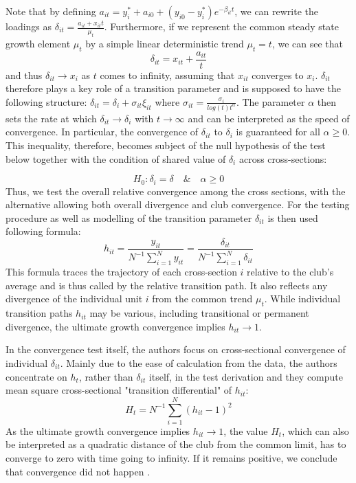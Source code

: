 \documentclass[11pt]{article}
\begin{document}
Note that by defining \(a_{it} = y_i^* + a_{i0} + (y_{i0} - y_i^*)e^{-\beta_{it}t} \), we can rewrite the loadings as \(\delta_{it} = \frac{a_{it} + x_{it}t}{\mu_t}\). Furthermore, if we represent the common steady state growth element $\mu_t$ by a simple linear deterministic trend \(\mu_t = t\), we can see that
\begin{equation} \label{eq5}\delta_{it} = x_{it} + \frac{a_{it}}{t} \end{equation}  and thus \(\delta_{it} \rightarrow x_i\) as $t$ comes to infinity, assuming that $x_{it}$ converges to $x_{i}$. $\delta_{it}$ therefore plays a key role of a transition parameter and is supposed to have the following structure: \(\delta_{it} = \delta_{i} + \sigma_{it}\xi_{it}\) where \( \sigma_{it} = \frac{\sigma_{i}}{log(t)t^\alpha}\). The parameter $\alpha$ then sets the rate at which \(\delta_{it} \rightarrow \delta_{i}\) with \(t \rightarrow \infty\) and can be interpreted as the speed of convergence. In particular, the convergence of $\delta_{it}$ to $\delta_{i}$ is guaranteed for all \(\alpha \geq 0\). This inequality, therefore, becomes subject of the null hypothesis of the test below together with the condition of shared value of $\delta_{i}$ across cross-sections: 

\begin{equation} \label{eq6} H_0: \delta_{i} = \delta \quad \& \quad \alpha \geq 0 \end{equation} Thus, we test the overall relative convergence among the cross sections, with the alternative allowing both overall divergence and club convergence.
For the testing procedure as well as modelling of the transition parameter $\delta_{it}$ is then used following formula:
\begin{equation}\label{eq8}h_{it} = \frac{y_{it}}{N^{-1}\sum\limits_{i=1}^Ny_{it}} = \frac{\delta_{it}}{N^{-1}\sum\limits_{i=1}^N\delta_{it}}\end{equation}
This formula traces the trajectory of each cross-section $i$ relative to the club's average and is thus called by \citet{phillips2009economic} the relative transition path. It also reflects any divergence of the individual unit $i$ from the common trend $\mu_t$. While individual transition paths $h_{it}$ may be various, including transitional or permanent divergence, the ultimate growth convergence implies \(h_{it} \rightarrow 1\).

In the convergence test itself, the authors focus on cross-sectional convergence of individual $\delta_{it}$. Mainly due to the ease of calculation from the data, the authors concentrate on $h_{t}$, rather than $\delta_{it}$ itself, in the test derivation and they compute mean square cross-sectional "transition differential" of $h_{it}$:
\begin{equation}\label{eq9}H_t = N^{-1}\sum\limits_{i=1}^N(h_{it} - 1)^2 \end{equation}
As the ultimate growth convergence implies \(h_{it} \rightarrow 1\), the value $H_{t}$, which can also be interpreted as a quadratic distance of the club from the common limit, has to converge to zero with time going to infinity. If it remains positive, we conclude that convergence did not happen \citep{phillips2009economic}.
\end{document}
